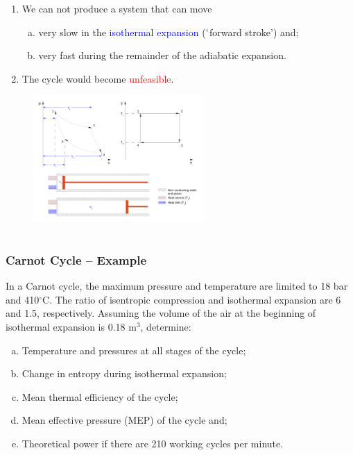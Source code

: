 \documentclass[10pt,compress]{beamer}
\newcommand{\red}{\textcolor{red}}
\newcommand{\blue}{\textcolor{blue}}
\begin{document}
\begin{frame}
\begin{columns}
\begin{column}[c]{0.55\linewidth}
\begin{enumerate}[(1)]
     \item<5-> We can not produce a system that can move
     \begin{enumerate}[(a)] \scriptsize
        \item<5-> very slow in the \blue{isothermal expansion} ($\lq$forward stroke') and;
        \item<5-> very fast during the remainder of the adiabatic expansion. 
     \end{enumerate}
     \item<6-> The cycle would become \red{unfeasible}.
   \end{enumerate} 
   \begin{figure}%
    \begin{center}
     \includegraphics[width=6.5cm,clip]{./Pics/Carnot_Reciprocating}
    \end{center}
   \end{figure} 
  \end{column}  
 \end{columns} 
\end{frame}

\begin{frame}
 \frametitle{Carnot Cycle -- Example}
     In a Carnot cycle, the maximum pressure and temperature are limited to 18 bar and 410$^{\circ}$C. The ratio of isentropic compression and isothermal expansion are 6 and 1.5, respectively. Assuming the volume of the air at the beginning of isothermal expansion is 0.18 m$^{3}$, determine:
       \begin{enumerate}[(a)]
          \item Temperature and pressures at all stages of the cycle; 
          \item Change in entropy during isothermal expansion; 
          \item Mean thermal efficiency of the cycle; 
          \item Mean effective pressure (MEP) of the cycle and;
          \item Theoretical power if there are 210 working cycles per minute.
       \end{enumerate}
\end{frame}
\end{document}
